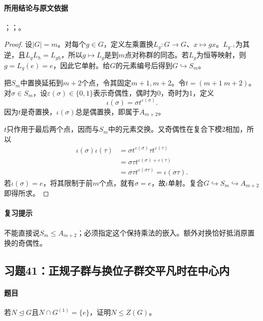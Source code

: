\paragraph{所用结论与原文依据}
；；。


\begin{proof}
设$|G|=m$。对每个$g\in G$，定义左乘置换$L_g:G\to G$、$x\mapsto gx$。$L_{g^{-1}}$为其逆，且$L_gL_h=L_{gh}$，所以$g\mapsto L_g$是到$m$点对称群的同态。若$L_g$为恒等映射，则$g=L_g(e)=e$，因此它单射。给$G$的元素编号后得到$G\hookrightarrow S_m$。

把$S_m$中置换延拓到$m+2$个点，令其固定$m+1,m+2$。令$t=(m+1\ m+2)$。对$\sigma\in S_m$，设$\varepsilon(\sigma)\in\{0,1\}$表示奇偶性，偶时为0，奇时为1，定义
\[
\iota(\sigma)=\sigma t^{\varepsilon(\sigma)}.
\]
因为$t$是奇置换，$\iota(\sigma)$总是偶置换，即属于$A_{m+2}$。

$t$只作用于最后两个点，因而与$S_m$中的元素交换。又奇偶性在复合下模2相加，所以
\begin{align*}
\iota(\sigma)\iota(\tau)
&=\sigma t^{\varepsilon(\sigma)}\tau t^{\varepsilon(\tau)}\\
&=\sigma\tau t^{\varepsilon(\sigma)+\varepsilon(\tau)}\\
&=\sigma\tau t^{\varepsilon(\sigma\tau)}
=\iota(\sigma\tau).
\end{align*}
若$\iota(\sigma)=e$，将其限制于前$m$个点，就有$\sigma=e$，故$\iota$单射。复合$G\hookrightarrow S_m\hookrightarrow A_{m+2}$即得所求。
\end{proof}

\paragraph{复习提示}
不能直接说$S_m\le A_{m+2}$；必须指定这个保持乘法的嵌入。额外对换恰好抵消原置换的奇偶性。


\subsection{习题41：\texorpdfstring{正规子群与换位子群交平凡时在中心内}{正规子群与换位子群交平凡时在中心内}}
\label{ex:2:41}

\paragraph{题目}
若$N\trianglelefteq G$且$N\cap G^{(1)}=\{e\}$，证明$N\le Z(G)$。

